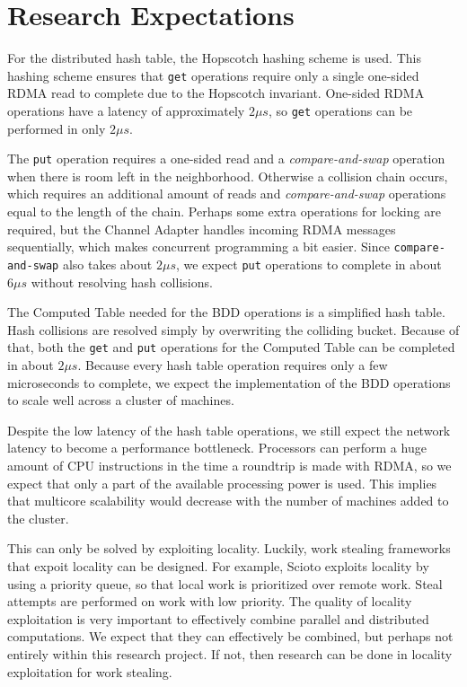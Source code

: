 \chapter{Research Expectations}

For the distributed hash table, the Hopscotch hashing scheme is used. This hashing scheme ensures that \texttt{get} operations require only a single one-sided RDMA read to complete due to the Hopscotch invariant. One-sided RDMA operations have a latency of approximately $2 \mu s$, so \texttt{get} operations can be performed in only $2 \mu s$. 

The \texttt{put} operation requires a one-sided read and a \emph{compare-and-swap} operation when there is room left in the neighborhood. Otherwise a collision chain occurs, which requires an additional amount of reads and \emph{compare-and-swap} operations equal to the length of the chain. Perhaps some extra operations for locking are required, but the Channel Adapter handles incoming RDMA messages sequentially, which makes concurrent programming a bit easier. Since \texttt{compare-and-swap} also takes about $2 \mu s$, we expect \texttt{put} operations to complete in about $6 \mu s$ without resolving hash collisions.

The Computed Table needed for the BDD operations is a simplified hash table. Hash collisions are resolved simply by overwriting the colliding bucket. Because of that, both the \texttt{get} and \texttt{put} operations for the Computed Table can be completed in about $2 \mu s$. Because every hash table operation requires only a few microseconds to complete, we expect the implementation of the BDD operations to scale well across a cluster of machines.

Despite the low latency of the hash table operations, we still expect the network latency to become a performance bottleneck. Processors can perform a huge amount of CPU instructions in the time a roundtrip is made with RDMA, so we expect that only a part of the available processing power is used. This implies that multicore scalability would decrease with the number of machines added to the cluster.

This can only be solved by exploiting locality. Luckily, work stealing frameworks that expoit locality can be designed. For example, Scioto \cite{dinan2008scioto} exploits locality by using a priority queue, so that local work is prioritized over remote work. Steal attempts are performed on work with low priority. The quality of locality exploitation is very important to effectively combine parallel and distributed computations. We expect that they can effectively be combined, but perhaps not entirely within this research project. If not, then research can be done in locality exploitation for work stealing.